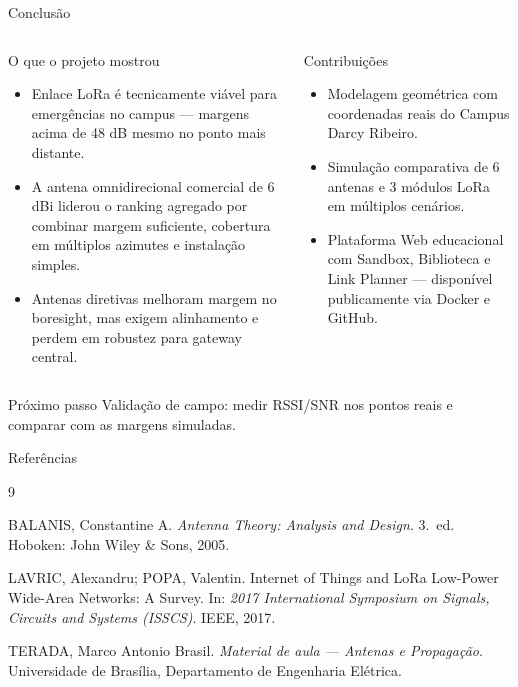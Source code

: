 \documentclass[aspectratio=169]{beamer}
\begin{document}
\begin{frame}{Conclusão}
\vspace{-.75cm}
\small
\begin{columns}[T,onlytextwidth]
\begin{block}{O que o projeto mostrou}
\begin{itemize}
  \item Enlace LoRa é tecnicamente viável para emergências no campus — margens acima de 48 dB mesmo no ponto mais distante.
  \item A antena omnidirecional comercial de 6 dBi liderou o ranking agregado por combinar margem suficiente, cobertura em múltiplos azimutes e instalação simples.
  \item Antenas diretivas melhoram margem no boresight, mas exigem alinhamento e perdem em robustez para gateway central.
\end{itemize}
\end{block}
\begin{block}{Contribuições}
\begin{itemize}
  \item Modelagem geométrica com coordenadas reais do Campus Darcy Ribeiro.
  \item Simulação comparativa de 6 antenas e 3 módulos LoRa em múltiplos cenários.
  \item Plataforma Web educacional com Sandbox, Biblioteca e Link Planner — disponível publicamente via Docker e GitHub.
\end{itemize}
\end{block}
\end{columns}
\begin{block}{Próximo passo}
Validação de campo: medir RSSI/SNR nos pontos reais e comparar com as margens simuladas.
\end{block}
\end{frame}

\begin{frame}{Referências}
\small
\begin{thebibliography}{9}

BALANIS, Constantine A.
\textit{Antenna Theory: Analysis and Design}.
3.~ed. Hoboken: John Wiley \& Sons, 2005.

LAVRIC, Alexandru; POPA, Valentin.
Internet of Things and LoRa\texttrademark{} Low-Power Wide-Area Networks: A Survey.
In: \textit{2017 International Symposium on Signals, Circuits and Systems (ISSCS)}.
IEEE, 2017.

TERADA, Marco Antonio Brasil.
\textit{Material de aula — Antenas e Propagação}.
Universidade de Brasília, Departamento de Engenharia Elétrica.

\end{thebibliography}
\end{frame}
\end{document}
